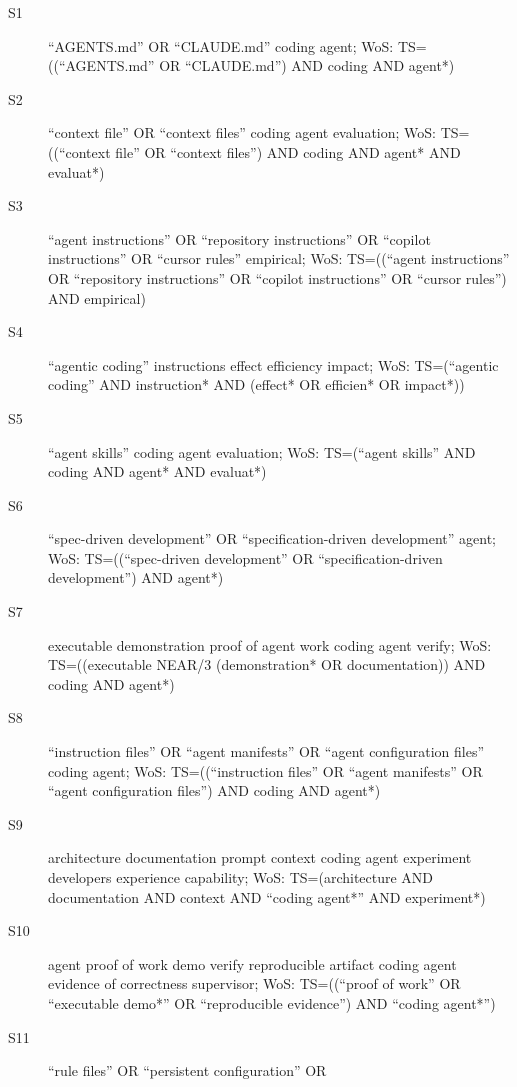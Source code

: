 \begin{description}
  \item[S1] \enquote{AGENTS.md} OR \enquote{CLAUDE.md} coding agent; WoS:
    TS=((\enquote{AGENTS.md} OR \enquote{CLAUDE.md}) AND coding AND agent*)
  \item[S2] \enquote{context file} OR \enquote{context files} coding agent
    evaluation; WoS: TS=((\enquote{context file} OR \enquote{context files})
    AND coding AND agent* AND evaluat*)
  \item[S3] \enquote{agent instructions} OR \enquote{repository instructions}
    OR \enquote{copilot instructions} OR \enquote{cursor rules} empirical; WoS:
    TS=((\enquote{agent instructions} OR \enquote{repository instructions} OR
    \enquote{copilot instructions} OR \enquote{cursor rules}) AND empirical)
  \item[S4] \enquote{agentic coding} instructions effect efficiency impact;
    WoS: TS=(\enquote{agentic coding} AND instruction* AND (effect* OR
    efficien* OR impact*))
  \item[S5] \enquote{agent skills} coding agent evaluation; WoS:
    TS=(\enquote{agent skills} AND coding AND agent* AND evaluat*)
  \item[S6] \enquote{spec-driven development} OR \enquote{specification-driven
    development} agent; WoS:
    TS=((\enquote{spec-driven development} OR \enquote{specification-driven
    development}) AND agent*)
  \item[S7] executable demonstration proof of agent work coding agent verify;
    WoS: TS=((executable NEAR/3 (demonstration* OR documentation)) AND coding
    AND agent*)
  \item[S8] \enquote{instruction files} OR \enquote{agent manifests} OR
    \enquote{agent configuration files} coding agent; WoS:
    TS=((\enquote{instruction files} OR \enquote{agent manifests} OR
    \enquote{agent configuration files}) AND coding AND agent*)
  \item[S9] architecture documentation prompt context coding agent experiment
    developers experience capability; WoS: TS=(architecture AND documentation
    AND context AND \enquote{coding agent*} AND experiment*)
  \item[S10] agent proof of work demo verify reproducible artifact coding agent
    evidence of correctness supervisor; WoS: TS=((\enquote{proof of work} OR
    \enquote{executable demo*} OR \enquote{reproducible evidence}) AND
    \enquote{coding agent*})
  \item[S11] \enquote{rule files} OR \enquote{persistent configuration} OR

\end{description}
